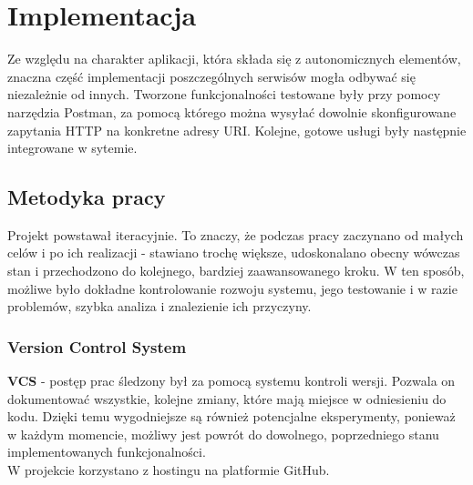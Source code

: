 \chapter{Implementacja}
\label{cha:implementacja}

Ze względu na charakter aplikacji, która składa się z autonomicznych elementów, znaczna część implementacji poszczególnych serwisów mogła odbywać się niezależnie od innych. Tworzone funkcjonalności testowane były przy pomocy narzędzia Postman, za pomocą którego można wysyłać dowolnie skonfigurowane zapytania HTTP na konkretne adresy URI. Kolejne, gotowe usługi były następnie integrowane w sytemie.


\section{Metodyka pracy}
Projekt powstawał iteracyjnie. To znaczy, że podczas pracy zaczynano od małych celów i po ich realizacji - stawiano trochę większe, udoskonalano obecny wówczas stan i przechodzono do kolejnego, bardziej zaawansowanego kroku. W ten sposób, możliwe było dokładne kontrolowanie rozwoju systemu, jego testowanie i w razie problemów, szybka analiza i znalezienie ich przyczyny. 

\subsection{Version Control System}
\textbf{VCS} - postęp prac śledzony był za pomocą systemu kontroli wersji.
Pozwala on dokumentować wszystkie, kolejne zmiany, które mają miejsce w odniesieniu do kodu. Dzięki temu wygodniejsze są również potencjalne eksperymenty, ponieważ w każdym momencie, możliwy jest powrót do dowolnego, poprzedniego stanu implementowanych funkcjonalności.\cite{vcs}\\
W projekcie korzystano z hostingu na platformie GitHub.

